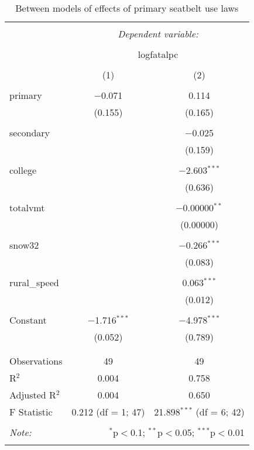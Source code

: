 \documentclass{article}
\begin{document}
\begin{table}[!htbp] \centering 
  \caption{Between models of effects of primary seatbelt use laws} 
  \label{} 
\footnotesize 
\begin{tabular}{@{\extracolsep{5pt}}lcc} 
\\[-1.8ex]\hline 
\hline \\[-1.8ex] 
 & \multicolumn{2}{c}{\textit{Dependent variable:}} \\ 
\cline{2-3} 
\\[-1.8ex] & \multicolumn{2}{c}{logfatalpc} \\ 
\\[-1.8ex] & (1) & (2)\\ 
\hline \\[-1.8ex] 
 primary & $-$0.071 & 0.114 \\ 
  & (0.155) & (0.165) \\ 
  & & \\ 
 secondary &  & $-$0.025 \\ 
  &  & (0.159) \\ 
  & & \\ 
 college &  & $-$2.603$^{***}$ \\ 
  &  & (0.636) \\ 
  & & \\ 
 totalvmt &  & $-$0.00000$^{**}$ \\ 
  &  & (0.00000) \\ 
  & & \\ 
 snow32 &  & $-$0.266$^{***}$ \\ 
  &  & (0.083) \\ 
  & & \\ 
 rural\_speed &  & 0.063$^{***}$ \\ 
  &  & (0.012) \\ 
  & & \\ 
 Constant & $-$1.716$^{***}$ & $-$4.978$^{***}$ \\ 
  & (0.052) & (0.789) \\ 
  & & \\ 
\hline \\[-1.8ex] 
Observations & 49 & 49 \\ 
R$^{2}$ & 0.004 & 0.758 \\ 
Adjusted R$^{2}$ & 0.004 & 0.650 \\ 
F Statistic & 0.212 (df = 1; 47) & 21.898$^{***}$ (df = 6; 42) \\ 
\hline 
\hline \\[-1.8ex] 
\textit{Note:}  & \multicolumn{2}{r}{$^{*}$p$<$0.1; $^{**}$p$<$0.05; $^{***}$p$<$0.01} \\ 
\normalsize 
\end{tabular} 
\end{table} 
\end{document}
